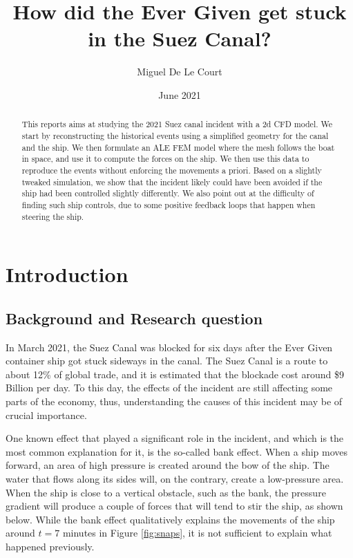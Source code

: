 \documentclass[a4paper]{article}
\title{How did the Ever Given get stuck in the Suez Canal?}
\author{Miguel De Le Court}
\date{June 2021}
\begin{document}
\maketitle

\vfill

\begin{abstract}
	This reports aims at studying the 2021 Suez canal incident with a 2d CFD model. We start by reconstructing the historical events using a simplified geometry for the canal and the ship. We then formulate an ALE FEM model where the mesh follows the boat in space, and use it to compute the forces on the ship. We then use this data to reproduce the events without enforcing the movements a priori. Based on a slightly tweaked simulation, we show that the incident likely could have been avoided if the ship had been controlled slightly differently. We also point out at the difficulty of finding such ship controls, due to some positive feedback loops that happen when steering the ship.
\end{abstract}
\vfill

\tableofcontents

\newpage
\section{Introduction}
\subsection{Background and Research question}
In March 2021, the Suez Canal was blocked for six days after the Ever Given container ship got stuck sideways in the canal. The Suez Canal is a route to about 12\% of global trade, and it is estimated that the blockade cost around \$9 Billion per day\cite{bbc:cost}\cite{bbc:cost2}\cite{guardian:cost}. To this day, the effects of the incident are still affecting some parts of the economy\cite{consequ1}\cite{consequ2}, thus, understanding the causes of this incident may be of crucial importance. 

One known effect that played a significant role in the incident, and which is the most common explanation for it, is the so-called bank effect. When a ship moves forward, an area of high pressure is created around the bow of the ship. The water that flows along its sides will, on the contrary, create a low-pressure area. When the ship is close to a vertical obstacle, such as the bank, the pressure gradient will produce a couple of forces that will tend to stir the ship\cite{bankeffect}, as shown below. While the bank effect qualitatively explains the movements of the ship around $t=7$ minutes in Figure \ref{fig:snaps}, it is not sufficient to explain what happened previously.
\end{document}
